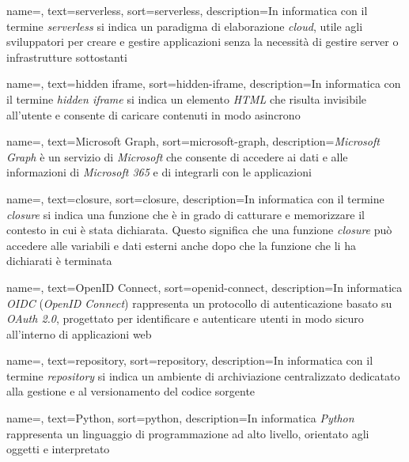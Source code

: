  {
    name=,
    text=serverless,
    sort=serverless,
    description={In informatica con il termine \emph{serverless} si indica un paradigma di elaborazione \emph{cloud}, utile agli sviluppatori per creare e gestire applicazioni senza la necessità di gestire server o infrastrutture sottostanti}
}

 {
    name=,
    text=hidden iframe,
    sort=hidden-iframe,
    description={In informatica con il termine \emph{hidden iframe} si indica un elemento \emph{HTML} che risulta invisibile all'utente e consente di caricare contenuti in modo asincrono}
}

 {
    name=,
    text=Microsoft Graph,
    sort=microsoft-graph,
    description={\emph{Microsoft Graph} è un servizio di \emph{Microsoft} che consente di accedere ai dati e alle informazioni di \emph{Microsoft 365} e di integrarli con le applicazioni}
}

 {
    name=,
    text=closure,
    sort=closure,
    description={In informatica con il termine \emph{closure} si indica una funzione che è in grado di catturare e memorizzare il contesto in cui è stata dichiarata. Questo significa che una funzione \emph{closure} può accedere alle variabili e dati esterni anche dopo che la funzione che li ha dichiarati è terminata}
}

 {
    name=,
    text=OpenID Connect,
    sort=openid-connect,
    description={In informatica \emph{OIDC} (\emph{OpenID Connect}) rappresenta un protocollo di autenticazione basato su \emph{OAuth 2.0}, progettato per identificare e autenticare utenti in modo sicuro all'interno di applicazioni web}
}


 {
    name=,
    text=repository,
    sort=repository,
    description={In informatica con il termine \emph{repository} si indica un ambiente di archiviazione centralizzato dedicatato alla gestione e al versionamento del codice sorgente}
}

 {
    name=,
    text=Python,
    sort=python,
    description={In informatica \emph{Python} rappresenta un linguaggio di programmazione ad alto livello, orientato agli oggetti e interpretato}
}


